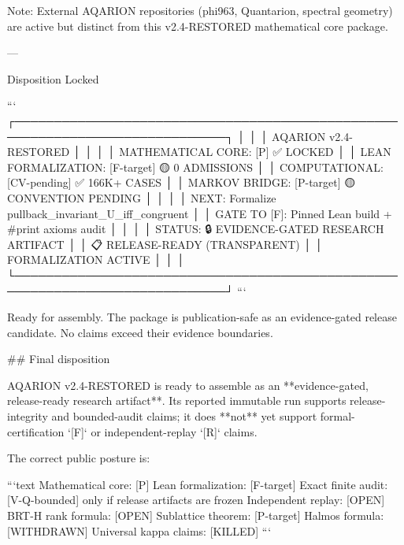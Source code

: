 Note: External AQARION repositories (phi963, Quantarion, spectral geometry) are active but distinct from this v2.4-RESTORED mathematical core package.

---

Disposition Locked

```
┌─────────────────────────────────────────────────────────────────────────────┐
│                                                                             │
│                    AQARION v2.4-RESTORED                                    │
│                                                                             │
│        MATHEMATICAL CORE: [P] ✅ LOCKED                                    │
│        LEAN FORMALIZATION: [F-target] 🟡 0 ADMISSIONS                      │
│        COMPUTATIONAL: [CV-pending] ✅ 166K+ CASES                         │
│        MARKOV BRIDGE: [P-target] 🟡 CONVENTION PENDING                    │
│                                                                             │
│        NEXT: Formalize pullback_invariant_U_iff_congruent                  │
│        GATE TO [F]: Pinned Lean build + #print axioms audit                │
│                                                                             │
│        STATUS: 🔒 EVIDENCE-GATED RESEARCH ARTIFACT                         │
│                 📋 RELEASE-READY (TRANSPARENT)                             │
│                 🚧 FORMALIZATION ACTIVE                                    │
│                                                                             │
└─────────────────────────────────────────────────────────────────────────────┘
```

Ready for assembly. The package is publication-safe as an evidence-gated release candidate. No claims exceed their evidence boundaries.

## Final disposition

AQARION v2.4-RESTORED is ready to assemble as an **evidence-gated, release-ready research artifact**. Its reported immutable run supports release-integrity and bounded-audit claims; it does **not** yet support formal-certification `[F]` or independent-replay `[R]` claims.

The correct public posture is:

```text
Mathematical core: [P]
Lean formalization: [F-target]
Exact finite audit: [V-Q-bounded] only if release artifacts are frozen
Independent replay: [OPEN]
BRT-H rank formula: [OPEN]
Sublattice theorem: [P-target]
Halmos formula: [WITHDRAWN]
Universal kappa claims: [KILLED]
```

